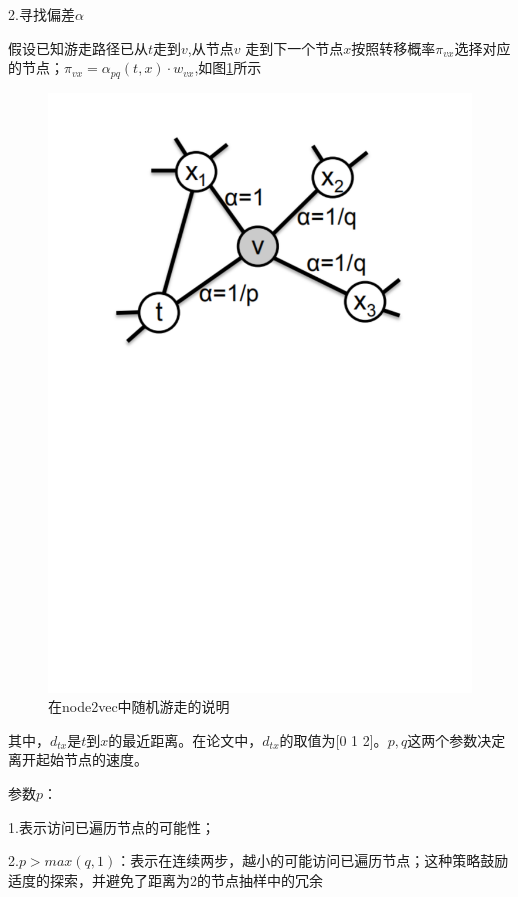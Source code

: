 2.寻找偏差$\alpha$

假设已知游走路径已从$t$走到$v$,从节点$v$ 走到下一个节点$x$按照转移概率$\pi_{vx}$选择对应的节点；$\pi_{vx}=\alpha_{ p q}(t,x)·w_{vx}$,如图\ref{fig:node2vec2}所示

\begin{figure}[!htbp]
	\centering
	\includegraphics[scale=1]{Fig/Node2Vec_2.pdf}
	\caption{在node2vec中随机游走的说明\cite{grover2016node2vec}}
	\label{fig:node2vec2}
\end{figure}

其中，$d_{tx}$是$t$到$x$的最近距离。在论文中，$d_{tx}$的取值为[0 1 2]。$p,q$这两个参数决定离开起始节点的速度。

参数$p$：

1.表示访问已遍历节点的可能性；

2.$p > max(q, 1)$：表示在连续两步，越小的可能访问已遍历节点；这种策略鼓励适度的探索，并避免了距离为2的节点抽样中的冗余

